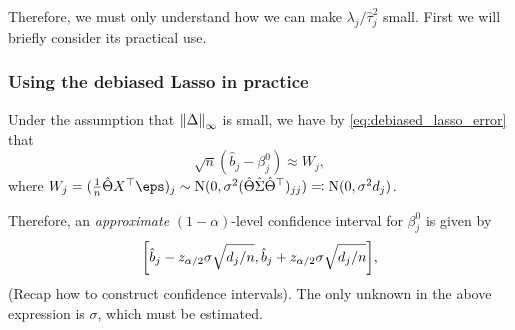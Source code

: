 Therefore, we must only understand how we can make $\lambda_j/\hat\tau_j^2$ small. First we will briefly consider its practical use. 

\subsubsection{Using the debiased Lasso in practice}
Under the assumption that $\norm{\Delta}_\infty$ is small, we have by \cref{eq:debiased_lasso_error} that
\[
\sqrt n(\hat b_j  - \beta^0_j) \approx  W_j, 
\]
where $W_j = (\frac1n \hat\Theta X\T\eps)_j \sim \Rm N(0, \sigma^2 (\hat\Theta\hat\Sigma\hat\Theta\T)_{jj}) \eqqcolon \Rm N(0, \sigma^2 d_j)$.

Therefore, an \emph{approximate} $(1 - \alpha)$-level confidence interval for $\beta^0_j$ is given by 
\[
\qty[\hat b_j - z_{\alpha/2} \sigma \sqrt{d_j/n} , \hat b_j + z_{\alpha / 2} \sigma \sqrt{{d_j}/{n}}],
\]  
(\TODO Recap how to construct confidence intervals).  The only unknown in the above expression is $\sigma$, which must be estimated. 
